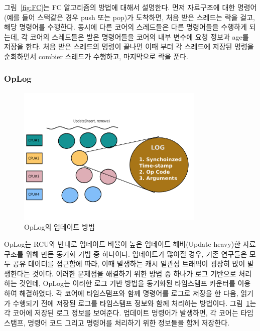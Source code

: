 그림~\ref{fig:FC}는 FC 알고리즘의 방법에 대해서 설명한다. 
먼저 자료구조에 대한 명령어(예를 들어 스택같은 경우 push 또는 pop)가 도착하면, 
처음 받은 스레드는 락을 걸고, 해당 명령어를 수행한다. 
동시에 다른 코어의 스레드들은 다른 명령어들을 수행하게 되는데, 각 코어의 스레드들은 
받은 명령어들을 코어의 내부 변수에 요청 정보과 age를 저장을 한다.
처음 받은 스레드의 명령이 끝나면 이때 부터 각 스레드에 저장된 명령을 순회하면서 combier 스레드가 
수행하고, 마지막으로 락을 푼다.

\subsubsection{OpLog}

\begin{figure}[h]
    \centering
    \includegraphics[width=0.8\textwidth]{fig/oplog_log}
    \caption{OpLog의 업데이트 방법}
  \label{fig:oplog}
\end{figure}


OpLog는 RCU와 반대로 업데이트 비율이 높은 업데이트 헤비(Update heavy)한 자료구조를 위해 만든 
동기화 기법 중 하나이다.
업데이트가 많아질 경우, 기존 연구들은 모두 공유 데이터를 접근함에 따라, 이때 발생하는 
캐시 일관성 트래픽이 굉장히 많이 발생한다는 것이다.
이러한 문제점을 해결하기 위한 방법 중 하나가 로그 기반으로 처리하는 것인데, OpLog는 이러한 로그 기반 
방법을 동기화된 타임스탬프 카운터를 이용하여 해결하였다. 
각 코어에 타임스탬프와 함께 명령어를 로그로 저장을 한 다음, 읽기가 수행되기 전에 
저장된 로그를 타임스탬프 정보와 함께 처리하는 방법이다.
그림~\ref{fig:oplog}는 각 코어에 저장된 로그 정보를 보여준다.
업데이트 명령어가 발생하면, 각 코어는 타임스탬프, 명령어 코드 그리고 명령어를 처리하기 위한 
정보들을 함께 저장한다.

 
 
 